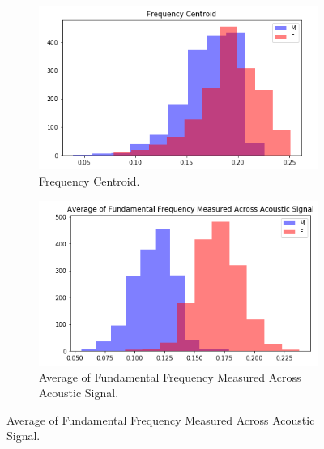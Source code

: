\documentclass[12pt]{article}
\begin{document}
\begin{figure}[H]
	\begin{subfigure}{0.49\linewidth}
		\centering
		\includegraphics[width=\linewidth]{images/hist_fc.png}
		\caption{Frequency Centroid.}
		\label{fig:hist_fc}
	\end{subfigure}
	\begin{subfigure}{0.49\linewidth}
		\centering
		\includegraphics[width=\linewidth]{images/hist_av_ffma.png}
		\caption{Average of Fundamental Frequency Measured Across Acoustic Signal.}
		\label{fig:hist_av_ffma}
	\end{subfigure}
	\hfill
	

\end{figure}
\end{document}
